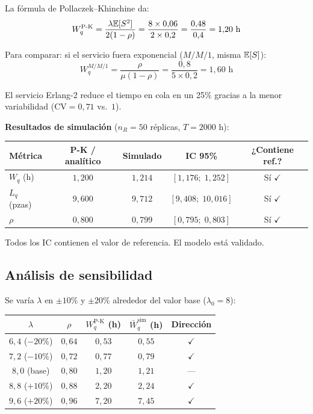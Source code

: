 \documentclass[11pt, letterpaper]{article}
\begin{document}
La fórmula de Pollaczek--Khinchine da:
\[
W_q^{\text{P-K}} = \frac{\lambda\mathbb{E}[S^2]}{2(1-\rho)} = \frac{8 \times 0{,}06}{2 \times 0{,}2} = \frac{0{,}48}{0{,}4} = 1{,}20 \text{ h}
\]

Para comparar: si el servicio fuera exponencial ($M/M/1$, misma $\mathbb{E}[S]$):
\[
W_q^{M/M/1} = \frac{\rho}{\mu(1-\rho)} = \frac{0{,}8}{5 \times 0{,}2} = 1{,}60 \text{ h}
\]

El servicio Erlang-2 reduce el tiempo en cola en un 25\% gracias a la menor variabilidad ($\text{CV}=0{,}71$ vs.\ $1$).

\textbf{Resultados de simulación} ($n_R=50$ réplicas, $T=2000$ h):

\begin{center}\small
\renewcommand{\arraystretch}{1.3}
\begin{tabular}{lcccc}
\toprule
\textbf{Métrica} & \textbf{P-K / analítico} & \textbf{Simulado} & \textbf{IC 95\%} & \textbf{¿Contiene ref.?} \\
\midrule
$W_q$ (h)    & $1{,}200$ & $1{,}214$ & $[1{,}176;\;1{,}252]$ & Sí $\checkmark$ \\
$L_q$ (pzas) & $9{,}600$ & $9{,}712$ & $[9{,}408;\;10{,}016]$& Sí $\checkmark$ \\
$\rho$       & $0{,}800$ & $0{,}799$ & $[0{,}795;\;0{,}803]$ & Sí $\checkmark$ \\
\bottomrule
\end{tabular}
\end{center}

Todos los IC contienen el valor de referencia. El modelo está validado.

\subsection{Análisis de sensibilidad}

Se varía $\lambda$ en $\pm 10\%$ y $\pm 20\%$ alrededor del valor base ($\lambda_0 = 8$):

\begin{center}\small
\renewcommand{\arraystretch}{1.3}
\begin{tabular}{ccccc}
\toprule
$\lambda$ & $\rho$ & $W_q^{\text{P-K}}$ (h) & $\bar W_q^{\text{sim}}$ (h) & \textbf{Dirección} \\
\midrule
$6{,}4$ ($-20\%$) & $0{,}64$ & $0{,}53$ & $0{,}55$ & $\checkmark$ \\
$7{,}2$ ($-10\%$) & $0{,}72$ & $0{,}77$ & $0{,}79$ & $\checkmark$ \\
$8{,}0$ (base)    & $0{,}80$ & $1{,}20$ & $1{,}21$ & --- \\
$8{,}8$ ($+10\%$) & $0{,}88$ & $2{,}20$ & $2{,}24$ & $\checkmark$ \\
$9{,}6$ ($+20\%$) & $0{,}96$ & $7{,}20$ & $7{,}45$ & $\checkmark$ \\
\bottomrule
\end{tabular}
\end{center}
\end{document}
